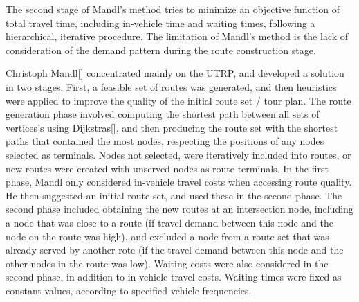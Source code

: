 The second stage of Mandl's method tries to minimize an objective function of total travel time, including in-vehicle time and waiting times, following a hierarchical, iterative procedure. The limitation of Mandl's method is the lack of consideration of the demand pattern during the route construction stage.

\citep{zhao03}
\par
Christoph Mandl[] concentrated mainly on the UTRP, and developed a solution in two stages. First, a feasible set of routes was generated, and then heuristics were applied to improve the quality of the initial route set / tour plan. The route generation phase involved computing the shortest path between all sets of vertices's using Dijkstras[], and then producing the route set with the shortest paths that contained the most nodes, respecting the positions of any nodes selected as terminals. Nodes not selected, were iteratively included into routes, or new routes were created with unserved nodes as route terminals. In the first phase, Mandl only considered in-vehicle travel costs when accessing route quality. He then suggested an initial route set, and used these in the second phase. The second phase included obtaining the new routes at an intersection node, including a node that was close to a route (if travel demand between this node and the node on the route was high), and excluded a node from a route set that was already served by another rote (if the travel demand between this node and the other nodes in the route was low). Waiting costs were also considered in the second phase, in addition to in-vehicle travel costs. Waiting times were fixed as constant values, according to specified vehicle frequencies. 
